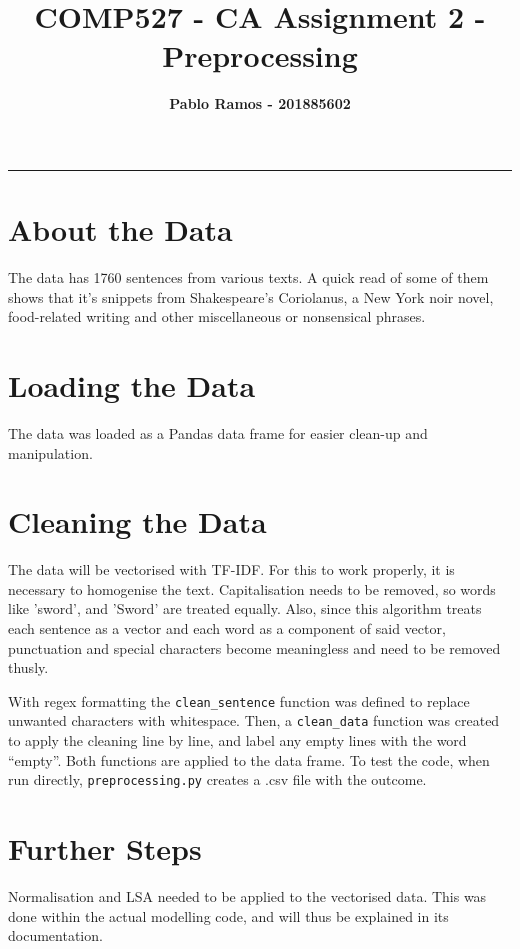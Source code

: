 \documentclass[11pt]{article}
\title{\textcolor{NavyBlue}{\textbf{COMP527 - CA Assignment 2 - Preprocessing}}}
\author{\textbf{Pablo Ramos - 201885602}}
\begin{document}
%
%
\maketitle
{\setlength\parindent{0mm} {\color{NavyBlue} \rule{\linewidth}{0.5mm}}} %
\section{About the Data}

The data has 1760 sentences from various texts. A quick read of some of them shows that it's snippets from Shakespeare's Coriolanus, a New York noir novel, food-related writing and other miscellaneous or nonsensical phrases.

\section{Loading the Data}

The data was loaded as a Pandas data frame for easier clean-up and manipulation. 

\section{Cleaning the Data}

The data will be vectorised with TF-IDF. For this to work properly, it is necessary to homogenise the text. Capitalisation needs to be removed, so words like 'sword', and 'Sword' are treated equally. Also, since this algorithm treats each sentence as a vector and each word as a component of said vector, punctuation and special characters become meaningless and need to be removed thusly.

With regex formatting the \texttt{clean\_sentence} function was defined to replace unwanted characters with whitespace. Then, a \texttt{clean\_data} function was created to apply the cleaning line by line, and label any empty lines with the word ``empty''. Both functions are applied to the data frame. To test the code, when run directly, \texttt{preprocessing.py} creates a .csv file with the outcome.

\section{Further Steps}
Normalisation and LSA needed to be applied to the vectorised data. This was done within the actual modelling code, and will thus be explained in its documentation.





\end{document}
